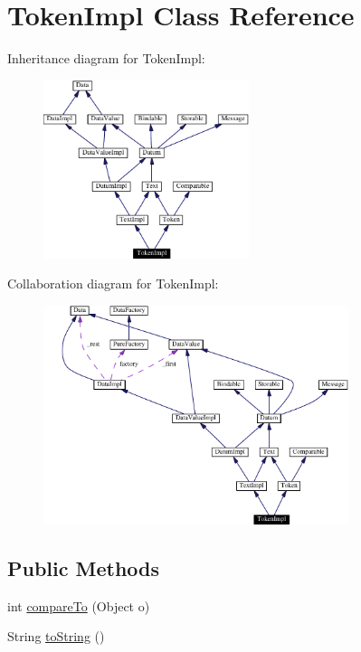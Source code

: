 \hypertarget{classTokenImpl}{
\section{Token\-Impl  Class Reference}
\label{classTokenImpl}
}
Inheritance diagram for Token\-Impl:\begin{figure}[H]
\begin{center}
\leavevmode
\includegraphics[width=170pt]{classTokenImpl__inherit__graph}
\end{center}
\end{figure}
Collaboration diagram for Token\-Impl:\begin{figure}[H]
\begin{center}
\leavevmode
\includegraphics[width=253pt]{classTokenImpl__coll__graph}
\end{center}
\end{figure}
\subsection*{Public Methods}
\begin{CompactItemize}
\item 
int \hyperlink{classTokenImpl_a0}{compare\-To} (Object o)
\item 
String \hyperlink{classTokenImpl_a1}{to\-String} ()
\end{CompactItemize}


